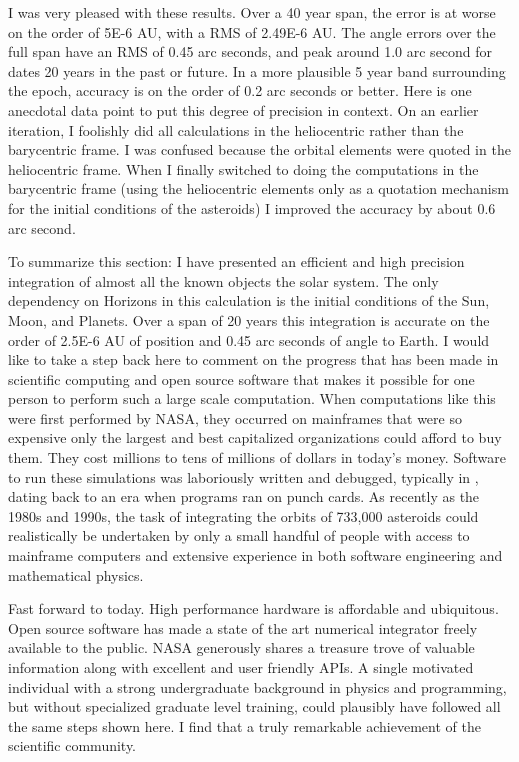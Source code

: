 I was very pleased with these results.
Over a 40 year span, the error is at worse on the order of 5E-6 AU, with a RMS of 2.49E-6 AU.
The angle errors over the full span have an RMS of 0.45 arc seconds,
and peak around 1.0 arc second for dates 20 years in the past or future.
In a more plausible 5 year band surrounding the epoch, accuracy is on the order of 0.2 arc seconds or better.
Here is one anecdotal data point to put this degree of precision in context.
On an earlier iteration, I foolishly did all calculations in the heliocentric rather than the barycentric frame.
I was confused because the orbital elements were quoted in the heliocentric frame.
When I finally switched to doing the computations in the barycentric frame 
(using the heliocentric elements only as a quotation mechanism for the initial conditions of the asteroids)
I improved the accuracy by about 0.6 arc second.

To summarize this section: I have presented an efficient and high precision integration of almost all the known objects the solar system.
The only dependency on Horizons in this calculation is the initial conditions of the Sun, Moon, and Planets.
Over a span of 20 years this integration is accurate on the order of 2.5E-6 AU of position and 0.45 arc seconds of angle to Earth.
I would like to take a step back here to comment on the progress that has been made in scientific computing and open source software
that makes it possible for one person to perform such a large scale computation.
When computations like this were first performed by NASA, they occurred on mainframes that were so expensive only the largest 
and best capitalized organizations could afford to buy them.
They cost millions to tens of millions of dollars in today's money.
Software to run these simulations was laboriously written and debugged, typically in , dating back to an era when programs ran on punch cards.
As recently as the 1980s and 1990s, the task of integrating the orbits of 733,000 asteroids could realistically be undertaken by only a small
handful of people with access to mainframe computers and extensive experience in both software engineering and mathematical physics.

Fast forward to today.  
High performance hardware is affordable and ubiquitous.
Open source software has made a state of the art numerical integrator freely available to the public.
NASA generously shares a treasure trove of valuable information along with excellent and user friendly APIs.
A single motivated individual with a strong undergraduate background in physics and programming,
but without specialized graduate level training, could plausibly have followed all the same steps shown here.
I find that a truly remarkable achievement of the scientific community.

